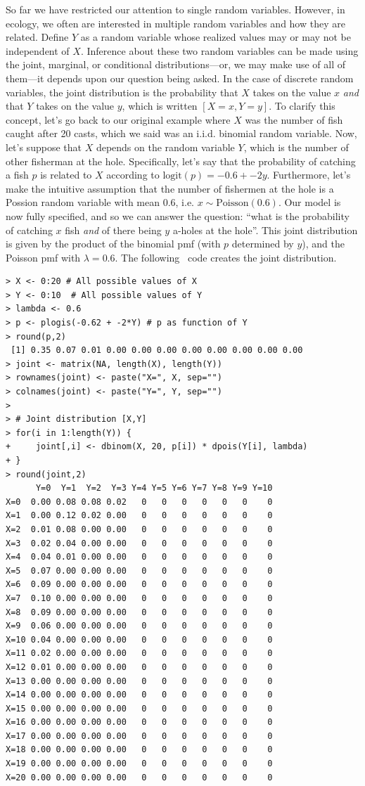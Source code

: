 So far we have restricted our attention to single random variables.
However, in ecology, we often are interested in multiple random
variables and how they are related. Define $Y$ as a random variable
whose realized values may or may not be independent of $X$. Inference
about these two random variables can be made using the joint,
marginal, or conditional distributions---or, we may make use of all of
them---it depends upon our question being asked. In the case of
discrete random variables, the joint
distribution is the probability that $X$ takes on the value $x$
\textit{and} that $Y$ takes on the value $y$, which is written
$[X=x,Y=y]$. To clarify this concept, let's go back to our original
example where $X$ was the number of fish caught after 20 casts, which
we said was an i.i.d.
binomial random variable. Now,
let's suppose that $X$ depends on the random variable $Y$, which is
the number of other fisherman at the hole. Specifically, let's say
that the probability of catching a fish $p$ is related to $X$
according to $\text{logit}(p) = -0.6 + -2y$. Furthermore, let's
make the intuitive assumption that the number of fishermen at the hole
is a Possion random variable with mean $0.6$, i.e. $x \sim
\text{Poisson}(0.6)$. Our model is now fully specified, and so we can
answer the question: ``what is the probability of catching $x$ fish
\textit{and} of there being $y$ a-holes at the hole''. This joint
distribution is given by the product of the binomial pmf (with $p$
determined by $y$), and the Poisson pmf with $\lambda=0.6$. The
following \R~code creates the joint distribution.
\begin{verbatim}
> X <- 0:20 # All possible values of X
> Y <- 0:10  # All possible values of Y
> lambda <- 0.6
> p <- plogis(-0.62 + -2*Y) # p as function of Y
> round(p,2)
 [1] 0.35 0.07 0.01 0.00 0.00 0.00 0.00 0.00 0.00 0.00 0.00
> joint <- matrix(NA, length(X), length(Y))
> rownames(joint) <- paste("X=", X, sep="")
> colnames(joint) <- paste("Y=", Y, sep="")
>
> # Joint distribution [X,Y]
> for(i in 1:length(Y)) {
+     joint[,i] <- dbinom(X, 20, p[i]) * dpois(Y[i], lambda)
+ }
> round(joint,2)
      Y=0  Y=1  Y=2  Y=3 Y=4 Y=5 Y=6 Y=7 Y=8 Y=9 Y=10
X=0  0.00 0.08 0.08 0.02   0   0   0   0   0   0    0
X=1  0.00 0.12 0.02 0.00   0   0   0   0   0   0    0
X=2  0.01 0.08 0.00 0.00   0   0   0   0   0   0    0
X=3  0.02 0.04 0.00 0.00   0   0   0   0   0   0    0
X=4  0.04 0.01 0.00 0.00   0   0   0   0   0   0    0
X=5  0.07 0.00 0.00 0.00   0   0   0   0   0   0    0
X=6  0.09 0.00 0.00 0.00   0   0   0   0   0   0    0
X=7  0.10 0.00 0.00 0.00   0   0   0   0   0   0    0
X=8  0.09 0.00 0.00 0.00   0   0   0   0   0   0    0
X=9  0.06 0.00 0.00 0.00   0   0   0   0   0   0    0
X=10 0.04 0.00 0.00 0.00   0   0   0   0   0   0    0
X=11 0.02 0.00 0.00 0.00   0   0   0   0   0   0    0
X=12 0.01 0.00 0.00 0.00   0   0   0   0   0   0    0
X=13 0.00 0.00 0.00 0.00   0   0   0   0   0   0    0
X=14 0.00 0.00 0.00 0.00   0   0   0   0   0   0    0
X=15 0.00 0.00 0.00 0.00   0   0   0   0   0   0    0
X=16 0.00 0.00 0.00 0.00   0   0   0   0   0   0    0
X=17 0.00 0.00 0.00 0.00   0   0   0   0   0   0    0
X=18 0.00 0.00 0.00 0.00   0   0   0   0   0   0    0
X=19 0.00 0.00 0.00 0.00   0   0   0   0   0   0    0
X=20 0.00 0.00 0.00 0.00   0   0   0   0   0   0    0
\end{verbatim}
